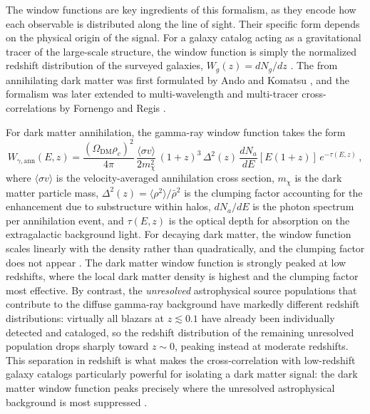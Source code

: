 The window functions are key ingredients of this formalism, as they encode how each observable is distributed along the line of sight.
Their specific form depends on the physical origin of the signal.
For a galaxy catalog acting as a gravitational tracer of the large-scale structure, the window function is simply the normalized redshift distribution of the surveyed galaxies, $W_g(z) = dN_g/dz$ \cite{Fornengo:2013rga}.
The \APS from annihilating dark matter was first formulated by Ando and Komatsu \cite{Ando:2005xg}, and the formalism was later extended to multi-wavelength and multi-tracer cross-correlations by Fornengo and Regis \cite{Fornengo:2013rga}.

For dark matter annihilation, the gamma-ray window function takes the form \cite{Fornengo:2013rga,Ando:2005xg}
\begin{equation}
	W_{\gamma,\mathrm{ann}}(E, z) = \frac{(\Omega_\mathrm{DM} \rho_c)^2}{4\pi}\, \frac{\langle \sigma v \rangle}{2 m_\chi^2}\, (1+z)^3\, \Delta^2(z)\, \frac{dN_a}{dE}[E(1+z)]\, e^{-\tau(E,z)}\,,
	\label{eq:window_dm_ann}
\end{equation}
where $\langle \sigma v \rangle$ is the velocity-averaged annihilation cross section, $m_\chi$ is the dark matter particle mass, $\Delta^2(z) = \langle \rho^2 \rangle / \bar{\rho}^2$ is the clumping factor accounting for the enhancement due to substructure within halos, $dN_a/dE$ is the photon spectrum per annihilation event, and $\tau(E,z)$ is the optical depth for absorption on the extragalactic background light.
For decaying dark matter, the window function scales linearly with the density rather than quadratically, and the clumping factor does not appear \cite{Fornengo:2013rga}.
The dark matter window function is strongly peaked at low redshifts, where the local dark matter density is highest and the clumping factor most effective.
By contrast, the \emph{unresolved} astrophysical source populations that contribute to the diffuse gamma-ray background have markedly different redshift distributions: virtually all blazars at $z \lesssim 0.1$ have already been individually detected and cataloged, so the redshift distribution of the remaining unresolved population drops sharply toward $z \sim 0$, peaking instead at moderate redshifts.
This separation in redshift is what makes the cross-correlation with low-redshift galaxy catalogs particularly powerful for isolating a dark matter signal: the dark matter window function peaks precisely where the unresolved astrophysical background is most suppressed \cite{Fornengo:2013rga}.

